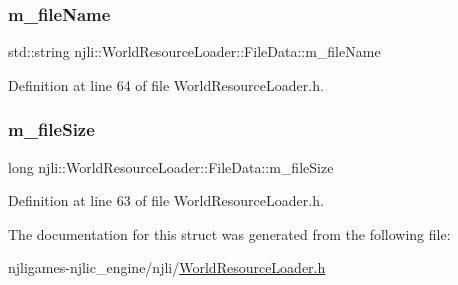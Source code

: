 \subsubsection{\texorpdfstring{m\+\_\+file\+Name}{m\_fileName}}
{\footnotesize\ttfamily std\+::string njli\+::\+World\+Resource\+Loader\+::\+File\+Data\+::m\+\_\+file\+Name\hspace{0.3cm}{\ttfamily [protected]}}



Definition at line 64 of file World\+Resource\+Loader.\+h.

\mbox{\label{structnjli_1_1_world_resource_loader_1_1_file_data_a83ed2ee2dcd559a58c02c7f63b8821ad}} 
\subsubsection{\texorpdfstring{m\+\_\+file\+Size}{m\_fileSize}}
{\footnotesize\ttfamily long njli\+::\+World\+Resource\+Loader\+::\+File\+Data\+::m\+\_\+file\+Size\hspace{0.3cm}{\ttfamily [protected]}}



Definition at line 63 of file World\+Resource\+Loader.\+h.



The documentation for this struct was generated from the following file\+:\begin{DoxyCompactItemize}
\item 
njligames-\/njlic\+\_\+engine/njli/\mbox{\hyperlink{_world_resource_loader_8h}{World\+Resource\+Loader.\+h}}\end{DoxyCompactItemize}
